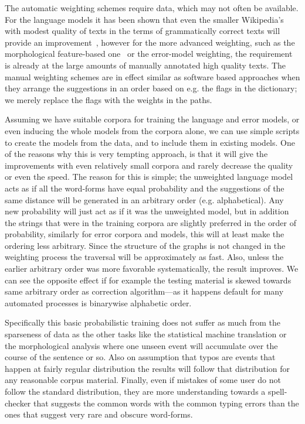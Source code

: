 \documentclass[a4paper,12pt]{article}
\begin{document}
The automatic weighting schemes require data, which may not often be available.
For the language models it has been shown that even the smaller Wikipedia's
with modest quality of texts in the terms of grammatically correct texts will
provide an improvement~\cite[]{pirinen/2010/lrec}, however for the more
advanced weighting, such as the morphological feature-based
one~\cite[]{pirinen2012improving} or the error-model weighting, the requirement
is already at the large amounts of manually annotated high quality texts. The
manual weighting schemes are in effect similar as software based approaches
when they arrange the suggestions in an order based on e.g. the flags in the
dictionary; we merely replace the flags with the weights in the paths.

Assuming we have suitable corpora for training the language and error models,
or even inducing the whole models from the corpora alone, we can use simple
scripts to create the models from the data, and to include them in existing
models. One of the reasons why this is very tempting approach, is that it will
give the improvements with even relatively small corpora and rarely decrease
the quality or even the speed. The reason for this is simple; the unweighted
language model acts as if all the word-forms have equal probability and the
suggestions of the same distance will be generated in an arbitrary order (e.g.
alphabetical). Any new probability will just act as if it was the unweighted
model, but in addition the strings that were in the training corpora are
slightly preferred in the order of probability, similarly for error corpora and
models, this will at least make the ordering less arbitrary. Since the
structure of the graphs is not changed in the weighting process the traversal
will be approximately as fast. Also, unless the earlier arbitrary order was
more favorable systematically, the result improves. We can see the opposite
effect if for example the testing material is skewed towards same arbitrary
order as correction algorithm---as it happens default for many automated
processes is binarywise alphabetic order.

Specifically this basic probabilistic training does not suffer as much from the
sparseness of data as the other tasks like the statistical machine translation
or the morphological analysis where one unseen event will accumulate over the
course of the sentence or so. Also on assumption that typos are events that
happen at fairly regular distribution the results will follow that distribution
for any reasonable corpus material. Finally, even if mistakes of some user do
not follow the standard distribution, they are more understanding towards a
spell-checker that suggests the common words with the common typing errors than
the ones that suggest very rare and obscure word-forms.
\end{document}
